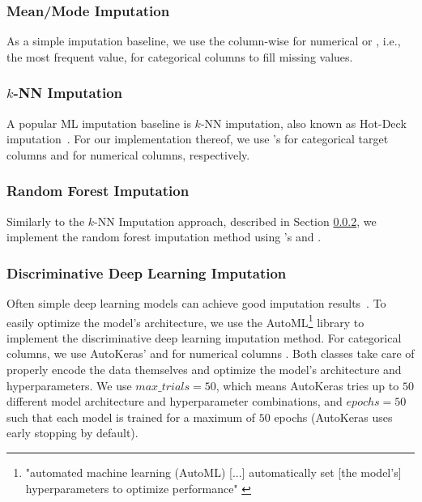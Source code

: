 \subsubsection{Mean/Mode Imputation}
\label{sec:simple_imputation}
%
As a simple imputation baseline, we use the column-wise  for numerical or , i.e., the most frequent value,  for categorical columns to fill missing values.


\subsubsection{$k$-NN Imputation}
\label{sec:knKNN}
%
A popular ML imputation baseline is $k$-NN imputation, also known as Hot-Deck imputation~\citep{Batista2003}. For our implementation thereof, we use 's  for categorical target columns and  for numerical columns, respectively.


\subsubsection{Random Forest Imputation}
%
Similarly to the $k$-NN Imputation approach, described in Section \ref{sec:knKNN}, we implement the random forest imputation method using 's  and .



\subsubsection{Discriminative Deep Learning Imputation}
\label{sec:dl_imputation}
%
Often simple deep learning models can achieve good imputation results~\citep{Biessmann2018a}. To easily optimize the model's architecture, we use the AutoML\footnote{"automated machine learning (AutoML) [...] automatically set [the model's] hyperparameters to optimize performance" \cite{AutoML}} library  \citep{AutoKeras} to implement the discriminative deep learning imputation method.
For categorical columns, we use AutoKeras'  and for numerical columns . Both classes take care of properly encode the data themselves and optimize the model's architecture and hyperparameters. We use $max\_trials = 50$, which means AutoKeras tries up to $50$ different model architecture and hyperparameter combinations, and $epochs = 50$ such that each model is trained for a maximum of $50$ epochs (AutoKeras uses early stopping by default).


